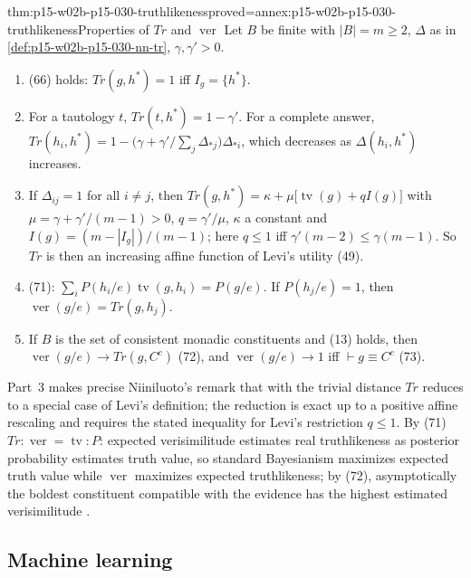 \begin{hbtheorem}{thm:p15-w02b-p15-030-truthlikeness}{proved=annex:p15-w02b-p15-030-truthlikeness}{Properties of \(Tr\) and \(\operatorname{ver}\)}
Let \(B\) be finite with \(|B|=m\geq2\), \(\Delta\) as in
\cref{def:p15-w02b-p15-030-nn-tr}, \(\gamma,\gamma'>0\).
\begin{enumerate}
\item (66) holds: \(Tr(g,h^*)=1\) iff \(I_g=\{h^*\}\).
\item For a tautology \(t\), \(Tr(t,h^*)=1-\gamma'\). For a complete answer,
  \(Tr(h_i,h^*)=1-\bigl(\gamma+\gamma'/\textstyle\sum_{j}\Delta_{*j}\bigr)\Delta_{*i}\),
  which decreases as \(\Delta(h_i,h^*)\) increases.
\item If \(\Delta_{ij}=1\) for all \(i\neq j\), then
  \(Tr(g,h^*)=\kappa+\mu\bigl[\operatorname{tv}(g)+qI(g)\bigr]\) with
  \(\mu=\gamma+\gamma'/(m-1)>0\), \(q=\gamma'/\mu\), \(\kappa\) a constant and
  \(I(g)=(m-|I_g|)/(m-1)\); here \(q\leq1\) iff \(\gamma'(m-2)\leq\gamma(m-1)\).
  So \(Tr\) is then an increasing affine function of Levi's utility (49).
\item (71): \(\sum_iP(h_i/e)\operatorname{tv}(g,h_i)=P(g/e)\). If \(P(h_j/e)=1\),
  then \(\operatorname{ver}(g/e)=Tr(g,h_j)\).
\item If \(B\) is the set of consistent monadic constituents and (13)
  holds, then \(\operatorname{ver}(g/e)\to Tr(g,C^c)\) (72), and
  \(\operatorname{ver}(g/e)\to1\) iff \(\vdash g\equiv C^c\) (73).
\end{enumerate}
\end{hbtheorem}

Part~3 makes precise Niiniluoto's remark that with the trivial distance
\(Tr\) reduces to a special case of Levi's definition; the reduction is
exact up to a positive affine rescaling and requires the stated inequality
for Levi's restriction \(q\leq1\). By (71) \(Tr:\operatorname{ver}=\operatorname{tv}:P\):
expected verisimilitude estimates real truthlikeness as posterior
probability estimates truth value, so standard Bayesianism maximizes
expected truth value while \(\operatorname{ver}\) maximizes expected
truthlikeness; by (72), asymptotically the boldest constituent compatible
with the evidence has the highest estimated verisimilitude
\cite[pp.~345--346]{Niiniluoto2011HintikkaProgramReading}.

\subsection{Machine learning}
\label{sec:p15-w02b-p15-030-nn-ml}

